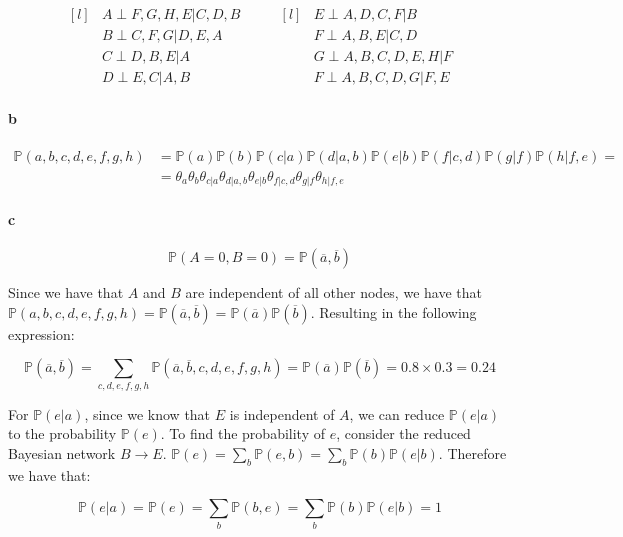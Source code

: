 \documentclass{amsart}
\theoremstyle{plain}
\newcommand{\pr}{\mathbb{P}}
\begin{document}
\begin{equation*}
  \begin{aligned}[l]
    &A\perp F,G,H,E | C,D,B\\
    &B\perp C,F,G | D,E,A\\
    &C\perp D,B,E | A\\
    &D\perp E,C | A,B
  \end{aligned}
  \qquad
  \begin{aligned}[l]
    &E\perp A,D,C,F | B\\
    &F\perp A,B,E | C,D\\
    &G\perp A,B,C,D,E,H | F\\
    &F\perp A,B,C,D,G | F,E
  \end{aligned}
\end{equation*}

\paragraph{b}

\begin{align*}
  \pr(a,b,c,d,e,f,g,h)&=\pr(a)\pr(b)\pr(c|a)\pr(d|a,b)\pr(e|b)\pr(f|c,d)\pr(g|f)\pr(h|f,e)=\\
                      &=\theta_a\theta_b\theta_{c|a}\theta_{d|a,b}\theta_{e|b}\theta_{f|c,d}
                      \theta_{g|f}\theta_{h|f,e}
\end{align*}

\paragraph{c}

\begin{equation*}
  \pr(A=0,B=0)=\pr(\overline{a},\overline{b})
\end{equation*}

Since we have that $A$ and $B$ are independent of all other nodes, we have that
$\pr(a,b,c,d,e,f,g,h)=\pr(\overline{a},\overline{b})=\pr(\overline{a})\pr(\overline{b})$. Resulting
in the following expression:

\begin{equation*}
  \pr(\overline{a},\overline{b})=\sum_{c,d,e,f,g,h}\pr(\overline{a},\overline{b},c,d,e,f,g,h)
  =\pr(\overline{a})\pr(\overline{b})=0.8 \times 0.3 = 0.24
\end{equation*}

For $\pr(e|a)$, since we know that $E$ is independent of $A$, we can reduce $\pr(e|a)$ to the
probability $\pr(e)$. To find the probability of $e$, consider the reduced Bayesian network
$B\rightarrow E$. $\pr(e)=\sum_b \pr(e,b)=\sum_b \pr(b)\pr(e|b)$. Therefore we have that:

\begin{equation*}
  \pr(e|a)=\pr(e)=\sum_b \pr(b,e)=\sum_b \pr(b)\pr(e|b)=1
\end{equation*}

\newpage

\printbibliography[]
\end{document}
